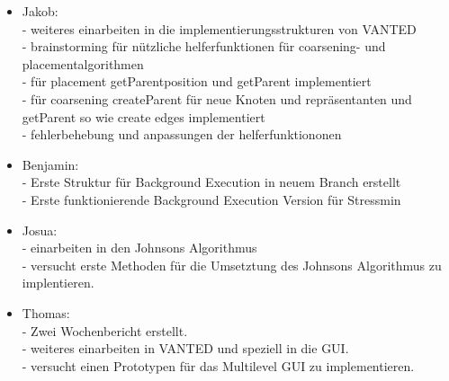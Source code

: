 \documentclass[]{article}
\begin{document}
\begin{itemize}
		\item Jakob: \\
		- weiteres einarbeiten in die implementierungsstrukturen von VANTED\\
		- brainstorming für nützliche helferfunktionen für coarsening- und placementalgorithmen\\
		- für placement getParentposition und getParent implementiert\\
		- für coarsening createParent für neue Knoten und repräsentanten und getParent so wie create edges implementiert\\
		- fehlerbehebung und anpassungen der helferfunktiononen\\
		
		\item Benjamin: \\
		- Erste Struktur für Background Execution in neuem Branch erstellt\\
		- Erste funktionierende Background Execution Version für Stressmin
	
		\item Josua: \\
		- einarbeiten in den Johnsons Algorithmus \\
		- versucht erste Methoden für die Umsetztung des Johnsons Algorithmus zu implentieren.
	
		\item Thomas: \\
		- Zwei Wochenbericht erstellt.\\
		- weiteres einarbeiten in VANTED und speziell in die GUI.\\
		- versucht einen Prototypen für das Multilevel GUI zu implementieren. 
		
	\end{itemize} 
	
\end{document}
